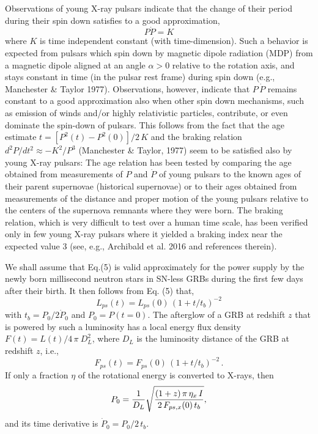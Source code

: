 \documentclass[twocolumn]{aastex61}
\begin{document}
Observations of young X-ray pulsars indicate that 
the change of their period  during their spin down 
satisfies to a good approximation,    
\begin{equation}
P\dot{P}=K
\end{equation}
where $K$ is time independent constant (with time-dimension). 
Such a behavior is expected from pulsars which spin down by 
magnetic dipole radiation (MDP) from a magnetic dipole aligned at an 
angle $\alpha>0$ relative to the rotation axis, and stays constant in 
time (in the pulsar rest frame) during spin down (e.g., Manchester
\& Taylor 1977). Observations, however, indicate that 
$P\,\dot{P}$ remains constant to a good approximation also when 
other spin down mechanisms, such as emission of winds and/or highly 
relativistic particles, contribute, or even dominate the spin-down
of pulsars. This follows from the fact that the  age estimate 
$t=[P^2(t)-P^2(0)]/2\,K$  and the braking relation 
$d^2P/dt^2\approx -K^2/P^3$ (Manchester \& Taylor, 1977)
seem to be satisfied also by young X-ray pulsars:
The age relation has been tested by comparing the age obtained from 
measurements of $P$ and $\dot{P}$ of young pulsars  to the known 
ages of their parent supernovae  (historical supernovae) or to their ages 
obtained from measurements of the distance and proper motion of the
young pulsars relative to the centers of the supernova remnants where 
they were born. The braking relation, which is very difficult to 
test over a human time scale, has been verified only in few young 
X-ray pulsars where it yielded a braking index near the expected 
value 3 (see, e.g., Archibald et al. 2016 and references therein).

We shall assume that Eq.(5) is valid approximately for the power 
supply by the newly born millisecond neutron stars in SN-less GRBs
during the first few days after their birth. 
It then follows from Eq. (5) that,
\begin{equation}
L_{ps}(t)=L_{ps}(0)\,(1 + t/t_b)^{-2}
\end{equation}
with $t_b=P_0/2\dot{P}_0$ and $P_0=P(t=0)$. The afterglow of a  
GRB at redshift $z$  that is powered by such a luminosity has a local
energy flux density $F(t)=L(t)/4\,\pi\ D_L^2$, where $D_L$ is the 
luminosity distance of the GRB at redshift $z$, i.e.,
\begin{equation} 
F_{ps}(t)=F_{ps}(0)\,(1 + t/t_b)^{-2}\, .
\end{equation}
If only a fraction $\eta$ of the rotational energy is converted to 
X-rays, then  
\begin{equation}
P_0={1\over D_L}\sqrt{{(1+z)\,\pi\, \eta_x\, I \over  2\,F_{ps,x}(0)\,t_b}},
\end{equation}
and its time derivative is  $\dot{P}_0=P_0/2\,t_b$. 
\end{document}
